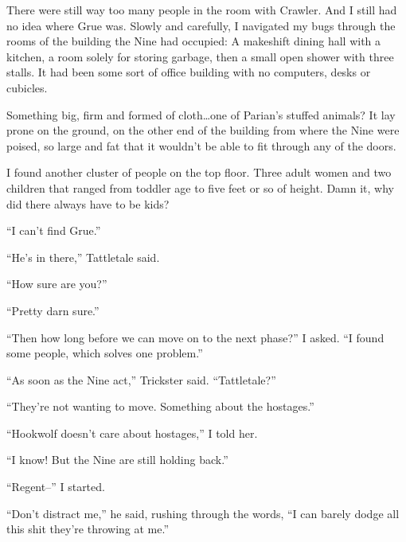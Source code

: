 There were still way too many people in the room with Crawler.  And I still had no idea where Grue was.  Slowly and carefully, I navigated my bugs through the rooms of the building the Nine had occupied: A makeshift dining hall with a kitchen, a room solely for storing garbage, then a small open shower with three stalls.  It had been some sort of office building with no computers, desks or cubicles.



Something big, firm and formed of cloth\ldots one of Parian's stuffed animals?  It lay prone on the ground, on the other end of the building from where the Nine were poised, so large and fat that it wouldn't be able to fit through any of the doors.



I found another cluster of people on the top floor.  Three adult women and two children that ranged from toddler age to five feet or so of height.  Damn it, why did there always have to be kids?



``I can't find Grue.''



``He's in there,'' Tattletale said.



``How sure are you?''



``Pretty darn sure.''



``Then how long before we can move on to the next phase?'' I asked.  ``I found some people, which solves one problem.''



``As soon as the Nine act,'' Trickster said.  ``Tattletale?''



``They're not wanting to move.  Something about the hostages.''



``Hookwolf doesn't care about hostages,'' I told her.



``I know!  But the Nine are still holding back.''



``Regent--'' I started.



``Don't distract me,'' he said, rushing through the words, ``I can barely dodge all this shit they're throwing at me.''



